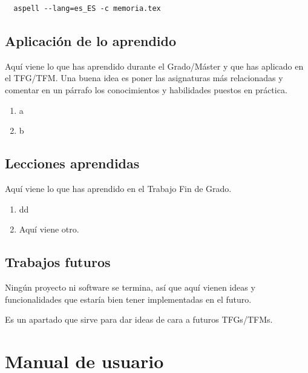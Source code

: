 \documentclass[a4paper, 12pt]{book}
\begin{document}
\begin{verbatim}
  aspell --lang=es_ES -c memoria.tex
\end{verbatim}

\section{Aplicación de lo aprendido}
\label{sec:aplicacion}

Aquí viene lo que has aprendido durante el Grado/Máster y que has aplicado en el TFG/TFM. Una buena idea es poner las asignaturas más relacionadas y comentar en un párrafo los conocimientos y habilidades puestos en práctica.

\begin{enumerate}
  \item a
  \item b
\end{enumerate}


\section{Lecciones aprendidas}
\label{sec:lecciones_aprendidas}

Aquí viene lo que has aprendido en el Trabajo Fin de Grado.

\begin{enumerate}
  \item dd
  \item Aquí viene otro.
\end{enumerate}


\section{Trabajos futuros}
\label{sec:trabajos_futuros}

Ningún proyecto ni software se termina, así que aquí vienen ideas y funcionalidades que estaría bien tener implementadas en el futuro.

Es un apartado que sirve para dar ideas de cara a futuros TFGs/TFMs.



\cleardoublepage
\appendix
\chapter{Manual de usuario}
\label{app:manual}
\end{document}
